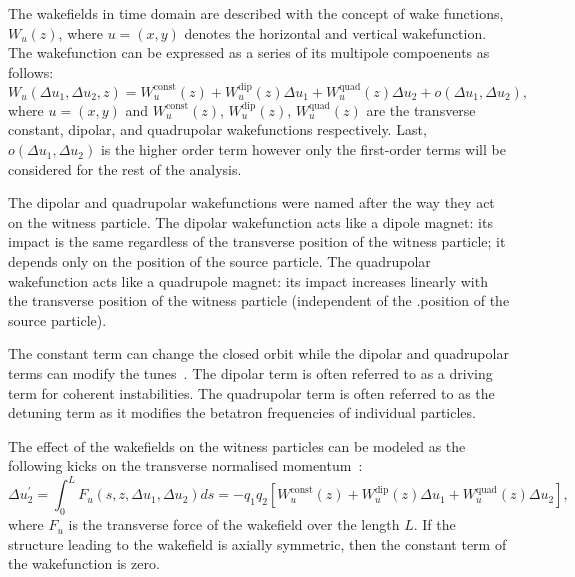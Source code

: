 The wakefields in time domain are described with the concept of wake functions, $W_u(z)$, where $u=(x,y)$ denotes the horizontal and vertical wakefunction. The wakefunction can be expressed as a series of its multipole compoenents as follows: %
\begin{equation}\label{eq:wakefunctions}
    W_u(\Delta u_1, \Delta u_2, z) = W^\mathrm{const}_u(z) + W^\mathrm{dip}_u(z)\Delta u_1 +  W^\mathrm{quad}_u(z)\Delta u_2 + o(\Delta u_1, \Delta u_2),
\end{equation}
where $u=(x,y)$ and $W^\mathrm{const}_u(z)$, $W^\mathrm{dip}_u(z)$, $W^\mathrm{quad}_u(z)$ are the transverse constant, dipolar, and quadrupolar wakefunctions respectively. Last, $ o(\Delta u_1, \Delta u_2)$ is the higher order term however only the first-order terms will be considered for the rest of the analysis. %

The dipolar and quadrupolar wakefunctions were named after the way they act on the witness particle. The dipolar wakefunction acts like a dipole magnet: its impact is the same regardless of the transverse position of the witness particle; it depends only on the position of the source particle. The quadrupolar wakefunction acts like a quadrupole magnet: its impact increases linearly with the transverse position of the witness particle (independent of the .position of the source particle). %

The constant term can change the closed orbit while the dipolar and quadrupolar terms can modify the tunes~\cite{benoit_ipac19_impedance}. The dipolar term is often referred to as a driving term for coherent instabilities. The quadrupolar term is often referred to as the detuning term as it modifies the betatron frequencies of individual particles. %

The effect of the wakefields on the witness particles can be modeled as the following kicks on the transverse normalised momentum~\cite{Schenk:2665819}: %
\begin{equation}\label{eq:wakefield_kicks}
    \Delta u_2^\prime  = \int_0^L F_u(s, z, \Delta u_1, \Delta u_2)ds = -q_1 q_2[W^\mathrm{const}_u(z) + W^\mathrm{dip}_u(z)\Delta u_1 +  W^\mathrm{quad}_u(z)\Delta u_2],
\end{equation}
where $F_u$ is the transverse force of the wakefield over the length $L$. If the structure leading to the wakefield is axially symmetric, then the constant term of the wakefunction is zero. 

